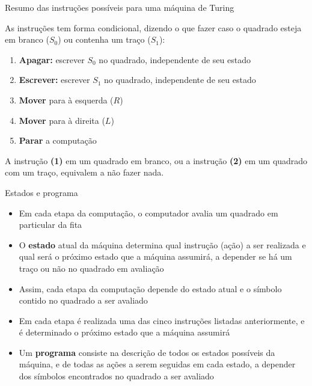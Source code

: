 \begin{frame}[fragile]{Resumo das instruções possíveis para uma máquina de Turing}

    As instruções tem forma condicional, dizendo o que fazer caso o quadrado esteja em branco
    ($S_0$) ou contenha um traço ($S_1$):

    \vspace{0.1in}

    \begin{enumerate}[(1)]
        \item \textbf{Apagar:} escrever $S_0$ no quadrado, independente de seu estado
        \item \textbf{Escrever:} escrever $S_1$ no quadrado, independente de seu estado
        \item \textbf{Mover} para à esquerda ($R$)
        \item \textbf{Mover} para à direita ($L$)
        \item \textbf{Parar} a computação
    \end{enumerate}

    \vspace{0.1in}
    A instrução \textbf{(1)} em um quadrado em branco, ou a instrução \textbf{(2)} em um quadrado
    com um traço, equivalem a não fazer nada.
\end{frame}

\begin{frame}[fragile]{Estados e programa}

    \begin{itemize}
        \item Em cada etapa da computação, o computador avalia um quadrado em particular da fita

        \item O \textbf{estado} atual da máquina determina qual instrução (ação) a ser realizada
            e qual será o próximo estado que a 
            máquina assumirá, a depender se há um traço ou não no quadrado em avaliação

        \item Assim, cada etapa da computação depende do estado atual e o símbolo contido no 
            quadrado a ser avaliado

        \item Em cada etapa é realizada uma das cinco instruções listadas anteriormente, e é 
            determinado o próximo estado que a máquina assumirá

        \item Um \textbf{programa} consiste na descrição de todos os estados possíveis da máquina,
            e de todas as ações a serem seguidas em cada estado, a depender dos símbolos 
            encontrados no quadrado a ser avaliado
    \end{itemize}

\end{frame}

